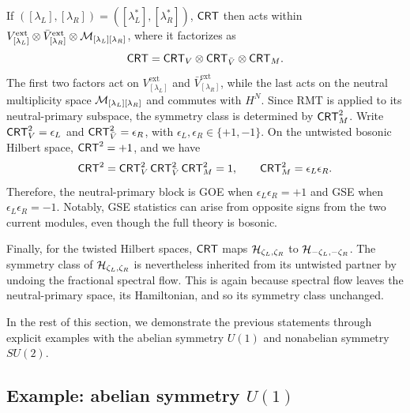 \documentclass[11pt]{article}
\numberwithin{equation}{section}
\begin{document}
If $([\lambda_L],[\lambda_R]) =
 ([\lambda_L^*],[\lambda_R^*])$, $\mathsf{CRT}$ then acts within $V^{\rm ext}_{[\lambda_L]}\otimes
 \bar V^{\rm ext}_{[\lambda_R]}\otimes
 \mathcal{M}_{[\lambda_L][\lambda_R]}$, where it factorizes as
\begin{equation}
\mathsf{CRT}=\mathsf{CRT}_V\otimes\mathsf{CRT}_{\bar V}\otimes\mathsf{CRT}_M.
\end{equation}
The first two factors act on $V^{\mathrm{ext}}_{[\lambda_L]}$ and $\bar V^{\mathrm{ext}}_{[\lambda_R]}$, while the last acts on the neutral multiplicity space $
 \mathcal{M}_{[\lambda_L][\lambda_R]}$ and commutes with $H^N$. Since RMT is applied to its neutral-primary subspace, the symmetry class is determined by $\mathsf{CRT}_M^2$. Write $\mathsf{CRT}_V^2=\epsilon_L$ and $\mathsf{CRT}_{\bar V}^2=\epsilon_R$, with $\epsilon_L,\epsilon_R\in\{+1,-1\}$. On the untwisted bosonic Hilbert space, $\mathsf{CRT}^2=+1$, and we have
\begin{equation}
\mathsf{CRT}^2=\mathsf{CRT}_V^2\,\mathsf{CRT}_{\bar V}^2\,\mathsf{CRT}_M^2=1,
 \qquad \mathsf{CRT}_M^2=\epsilon_L\epsilon_R.
\label{equ:CRTV-CRTM}
\end{equation}
Therefore, the neutral-primary block is GOE when $\epsilon_L\epsilon_R=+1$ and GSE when $\epsilon_L\epsilon_R=-1$. Notably, GSE statistics can arise from opposite signs from the two current modules,   even though the full theory is bosonic.



Finally, for the twisted Hilbert spaces, $\mathsf{CRT}$ maps $\mathcal H_{\zeta_L,\zeta_R}$ to $\mathcal H_{-\zeta_L,-\zeta_R}$. The symmetry class of $\mathcal H_{\zeta_L,\zeta_R}$ is nevertheless inherited from its untwisted partner by undoing the fractional spectral flow. This is again because spectral flow leaves the neutral-primary space, its Hamiltonian, and so its symmetry class unchanged. 

In the rest of this section, we demonstrate the previous statements through explicit examples with the abelian symmetry $U(1)$ and nonabelian symmetry $SU(2)$.

\subsection{Example: abelian symmetry $U(1)$}
\label{sec:U1-CFT}
\end{document}
